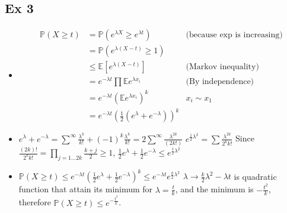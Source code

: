 \documentclass[12pt]{article}
\newcommand{\Q}[1]{\subsection*{Ex #1}}
\newenvironment{question}[1]
{\Q{#1}}{}
\newcommand{\esp}{{\mathbb E}}
\newcommand{\pr}{{\mathbb P}}
\begin{document}
\begin{question}{3}
\begin{itemize}
\item
  \begin{align*}
    \pr( X \ge t) &= \pr( e^{\lambda X} \ge e^{\lambda t}) &\text{(because $\exp$ is increasing)}
    \\& =  \pr( e^{\lambda (X - t)} \ge 1)
    \\&\le \esp[e^{\lambda (X - t)} ] &\text{(Markov inequality)}
    \\&= e^{-\lambda t} \prod \esp e^{\lambda x_i} &\text{(By independence)}
    \\& = e^{-\lambda t} (\esp e^{\lambda x_i})^k &x_i \sim x_1
    \\& = e^{-\lambda t} (\frac12 (e^{\lambda} + e^{-\lambda}))^k 
  \end{align*}
\item
  $e^{\lambda} + e^{-\lambda} = \sum^{\infty} \frac{\lambda^k}{k!} + (-1)^k \frac{\lambda^k}{k!} = 2 \sum^{\infty}  \frac{\lambda^{2k}}{(2k!)}$
  $e^{\frac12 \lambda^2} = \sum \frac{\lambda^{2k}}{2^k k!}$
  Since $\frac{(2k)!}{2^kk!} = \prod_{j = 1 \ldots 2k} \frac{k+j}{2} \ge 1$, $\frac12 e^{\lambda} + \frac12 e^{-\lambda} \le e^{\frac12 \lambda^2}$

\item $\pr(X \ge t) \le e^{-\lambda t} (\frac12 e^{\lambda} + \frac12 e^{-\lambda})^k \le e^{-\lambda t} e^{\frac k2 \lambda^2}$
$\lambda \rightarrow \frac k2 \lambda^2 - \lambda t$ is quadratic function that attain its minimum for $\lambda = \frac tk$, and the minimum is $-\frac{t^2}k$, therefore $ \pr(X \ge t) \le e^{-\frac{t^2}k}$.
\end{itemize}
\end{question}
\end{document}
